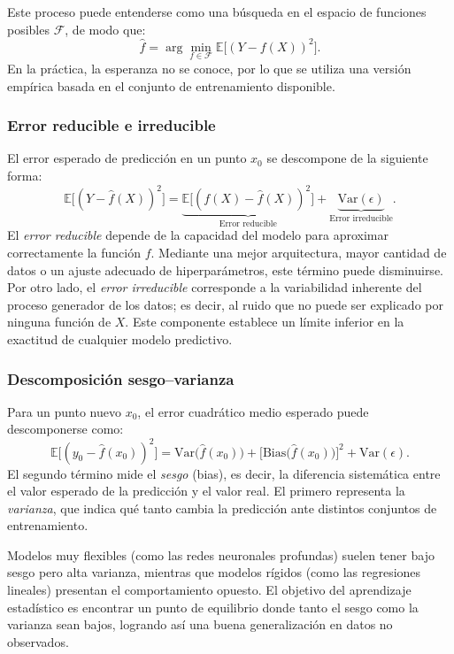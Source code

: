 \documentclass[12pt,letterpaper]{article}
\begin{document}
Este proceso puede entenderse como una búsqueda en el espacio de funciones posibles $\mathcal{F}$, de modo que:
\[
\hat{f} = \arg\min_{f \in \mathcal{F}} \mathbb{E}\big[(Y - f(X))^2\big].
\]
En la práctica, la esperanza no se conoce, por lo que se utiliza una versión empírica basada en el conjunto de entrenamiento disponible.

\subsubsection{Error reducible e irreducible}
El error esperado de predicción en un punto $x_0$ se descompone de la siguiente forma:
\[
\mathbb{E}\big[(Y - \hat{f}(X))^2\big] = 
\underbrace{\mathbb{E}\big[(f(X) - \hat{f}(X))^2\big]}_{\text{Error reducible}} 
+ 
\underbrace{\text{Var}(\epsilon)}_{\text{Error irreducible}}.
\]
El \textit{error reducible} depende de la capacidad del modelo para aproximar correctamente la función $f$.  
Mediante una mejor arquitectura, mayor cantidad de datos o un ajuste adecuado de hiperparámetros, este término puede disminuirse.  
Por otro lado, el \textit{error irreducible} corresponde a la variabilidad inherente del proceso generador de los datos; es decir, al ruido que no puede ser explicado por ninguna función de $X$.  
Este componente establece un límite inferior en la exactitud de cualquier modelo predictivo. \cite{texbook_ISLR}

\subsubsection{Descomposición sesgo–varianza}
Para un punto nuevo $x_0$, el error cuadrático medio esperado puede descomponerse como:
\[
\mathbb{E}\big[(y_0 - \hat{f}(x_0))^2\big] 
= 
\text{Var}\big(\hat{f}(x_0)\big)
+ 
\Big[\text{Bias}\big(\hat{f}(x_0)\big)\Big]^2
+ 
\text{Var}(\epsilon).
\]
El segundo término mide el \textit{sesgo} (bias), es decir, la diferencia sistemática entre el valor esperado de la predicción y el valor real.  
El primero representa la \textit{varianza}, que indica qué tanto cambia la predicción ante distintos conjuntos de entrenamiento.  

Modelos muy flexibles (como las redes neuronales profundas) suelen tener bajo sesgo pero alta varianza, mientras que modelos rígidos (como las regresiones lineales) presentan el comportamiento opuesto.  
El objetivo del aprendizaje estadístico es encontrar un punto de equilibrio donde tanto el sesgo como la varianza sean bajos, logrando así una buena generalización en datos no observados. \cite{texbook_ISLR}
\end{document}
